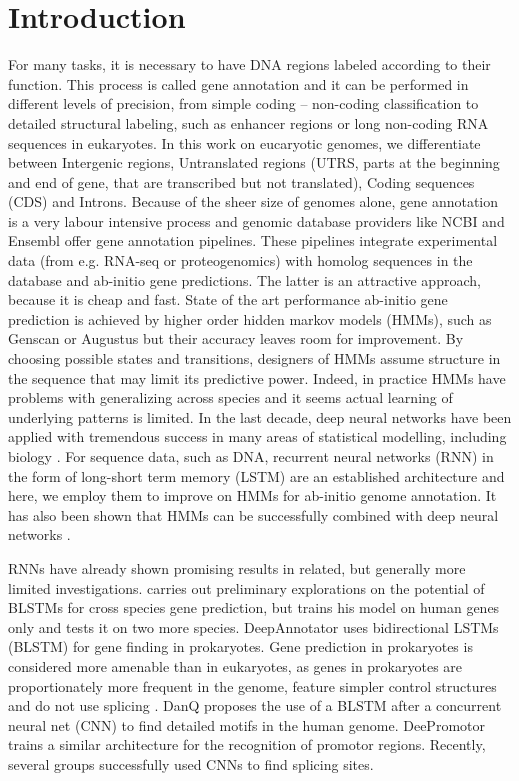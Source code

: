 \documentclass{bioinfo}
\begin{document}
\section{Introduction}
For many tasks, it is necessary to have DNA regions labeled according to their function. This process is called gene annotation and it can be performed in different levels of precision, from simple coding -- non-coding classification to detailed structural labeling, such as enhancer regions or long non-coding RNA sequences in eukaryotes. In this work on eucaryotic genomes, we differentiate between Intergenic regions, Untranslated regions (UTRS, parts at the beginning and end of gene, that are transcribed but not translated), Coding sequences (CDS) and Introns. Because of the sheer size of genomes alone, gene annotation is a very labour intensive process and genomic database providers like NCBI \citep{thibaud2013eukaryotic} and Ensembl \citep{aken2016ensembl} offer gene annotation pipelines. These pipelines integrate experimental data (from e.g. RNA-seq or proteogenomics) with homolog sequences in the database and ab-initio gene predictions. The latter is an attractive approach, because it is cheap and fast. State of the art performance ab-initio gene prediction is achieved by higher order hidden markov models (HMMs), such as Genscan \citep{burge1997prediction} or Augustus \citep{stanke2003gene} but their accuracy leaves room for improvement. By choosing possible states and transitions, designers of HMMs assume structure in the sequence that may limit its predictive power. Indeed, in practice HMMs have problems with generalizing across species and it seems actual learning of underlying patterns is limited. In the last decade, deep neural networks have been applied with tremendous success in many areas of statistical modelling, including biology \citep{ching2018opportunities}. For sequence data, such as DNA, recurrent neural networks (RNN) in the form of long-short term memory (LSTM) are an established architecture and here, we employ them to improve on HMMs for ab-initio genome annotation. It has also been shown that HMMs can be successfully combined with deep neural networks \citep{liu2016novo, liu2016pedla}.

RNNs have already shown promising results in related, but generally more limited investigations. \citep{choudharypredicting} carries out preliminary explorations on the potential of BLSTMs for cross species gene prediction, but trains his model on human genes only and tests it on two more species. DeepAnnotator \citep{amin2018deepannotator} uses bidirectional LSTMs (BLSTM) for gene finding in prokaryotes. Gene prediction in prokaryotes is considered more amenable than in eukaryotes, as genes in prokaryotes are proportionately more frequent in the genome, feature simpler control structures and do not use splicing \citep{wang2004brief}. DanQ \citep{quang2016danq} proposes the use of a BLSTM after a concurrent neural net (CNN) to find detailed motifs in the human genome. DeePromotor \citep{oubounyt2019deepromoter} trains a similar architecture for the recognition of promotor regions. Recently, several groups \citep{jaganathan2019predicting, wang2019splicefinder} successfully used CNNs to find splicing sites.
\end{document}
